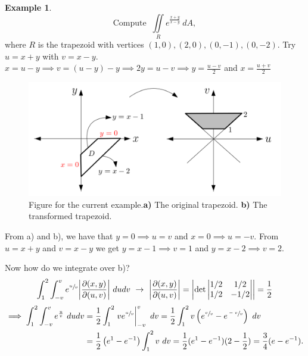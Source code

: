 \documentclass[
	12pt,
	]{article}
\theoremstyle{custom}
\theoremstyle{custom}
\theoremstyle{custom}
\theoremstyle{custom}
\theoremstyle{custom}
\theoremstyle{definition}
\newtheorem{example}{Example}[section]
\theoremstyle{example}
\theoremstyle{note}
\theoremstyle{remark}
\theoremstyle{example}
\newcounter{theo}[section]\setcounter{theo}{0}
\numberwithin{equation}{subsection}
\begin{document}
  			\begin{example} 
  			$$ \text{Compute } \ \iint\limits_R e^{\frac{x+y}{x-y}} \ dA,$$
  			where $R$ is the trapezoid with vertices $(1,0) , (2,0) , (0,-1), (0,-2).$ 
  			Try $u = x+y$ with $v = x-y$. $x = u-y \implies v = (u-y)-y \implies 2y = u-v \implies y= \frac{u-v}{2}$ and $x=\frac{u+v}{2}$
  				\begin{figure}[H]
  					\centering
  					\includegraphics[width=0.75\linewidth]{MATH314_Notes_Triple_Integral_Example2_Figure.png}\captionsetup{margin=1cm, justification=raggedright}\caption{Figure for the current example.\textbf{a)} The original trapezoid. \textbf{b)} The transformed trapezoid.}
  				\end{figure}
  			\noindent From a) and b), we have that $y=0 \implies u=v$ and $x=0 \implies u=-v$. From $u = x+y$ and $v=x-y$ we get $y = x-1 \implies v=1$ and $y = x-2 \implies v=2$.
  			
  			\noindent Now how do we integrate over b)? 
  			\begin{gather*}
  				\int_{1}^{2}\int_{-v}^{v} e^{\sfrac{u}{v}} \abs{\frac{\partial (x,y)}{\partial (u,v)}} \ dudv  \ \to \
  				\abs{\frac{\partial (x,y)}{\partial (u,v)}} = \abs{\det 
  				\begin{vmatrix}
  					1/2 & 1/2 \\
  					1/2 & -1/2
  				\end{vmatrix}
  				} =\frac12 
  			\end{gather*}
  			\begin{align*}
  				\implies \int_{1}^{2}\int_{-v}^{v} e^{\frac{u}{v}} \ dudv 
  				  				&= \frac12 \int_{1}^{2} \eval{ve^{\sfrac{u}{v}}}_{-v}^{v} \ dv = \frac12 \int_{1}^{2} v \left(e^{\sfrac{v}{v}} - e^{\sfrac{-v}{v}}\right) \ dv \\
  				  				&= \frac12 \left(e^{1} - e^{-1}\right) \int_{1}^{2} v \ dv = \frac12 (e^{1} - e^{-1})(2- \frac12) = \frac34 (e-e^{-1}).
  			\end{align*}
  			\end{example}
  			
\end{document}
